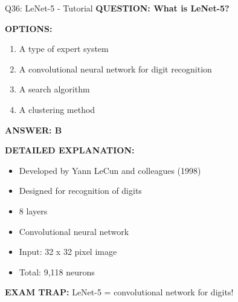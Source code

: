 \documentclass[8pt]{beamer}
\begin{document}
	\begin{frame}{Q36: LeNet-5 - Tutorial}
		\fontsize{6.5}{7.5}\selectfont
		\textbf{QUESTION: What is LeNet-5?}
		
		\vspace{0.1cm}
		\textbf{OPTIONS:}
		\begin{enumerate}
			\item A type of expert system
			\item A convolutional neural network for digit recognition
			\item A search algorithm
			\item A clustering method
		\end{enumerate}
		
		\vspace{0.1cm}
		\textcolor{myblue}{\textbf{ANSWER: B}}
		
		\vspace{0.1cm}
		\textbf{DETAILED EXPLANATION:}
		\begin{itemize}
			\item Developed by Yann LeCun and colleagues (1998)
			\item Designed for recognition of digits
			\item 8 layers
			\item Convolutional neural network
			\item Input: 32 x 32 pixel image
			\item Total: 9,118 neurons
		\end{itemize}
		
		\vspace{0.1cm}
		\textcolor{myred}{\textbf{EXAM TRAP:}} LeNet-5 = \textcolor{myblue}{convolutional network for digits}!
	\end{frame}
	
\end{document}
